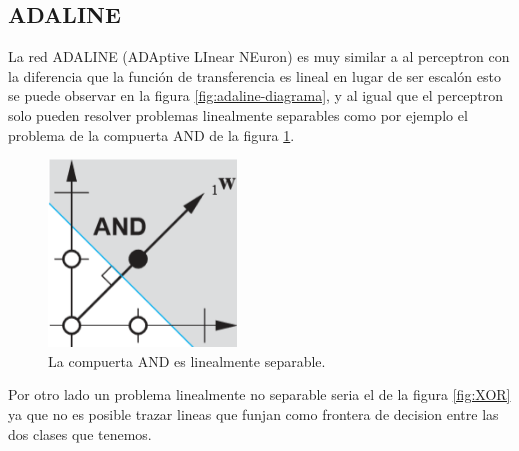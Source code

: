 \documentclass[12pt, titlepage]{article}
\begin{document}
        \subsection{ADALINE}
        La red ADALINE (ADAptive LInear NEuron) es muy similar a al perceptron con la diferencia que la función de transferencia es lineal en lugar de ser escalón esto se puede observar en la figura \ref{fig:adaline-diagrama}, y al igual que el perceptron solo pueden resolver problemas linealmente separables como por ejemplo el problema de la compuerta AND de la figura \ref{fig:AND}. \cite{pagina}
        \begin{figure}[H]
            \begin{center}
                \includegraphics[width=5cm]{img/adaline/AND.png}
                \caption{La compuerta AND es linealmente separable. \cite{libro1}}
                \label{fig:AND}
            \end{center}
        \end{figure}
        Por otro lado un problema linealmente no separable seria el de la figura \ref{fig:XOR} ya que no es posible trazar lineas que funjan como frontera de decision entre las dos clases que tenemos.
        
\end{document}
